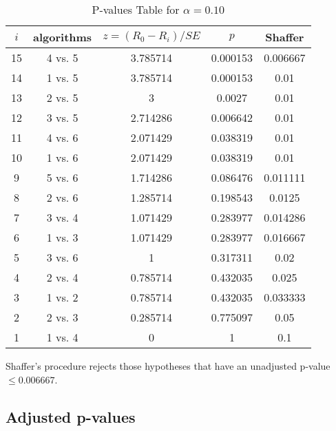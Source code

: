 \documentclass[a4paper,10pt]{article}
\begin{document}
\begin{landscape}
\begin{table}[!htp]
\centering\scriptsize
\begin{tabular}{ccccc}
$i$&algorithms&$z=(R_0 - R_i)/SE$&$p$&Shaffer\\
\hline15&4 vs. 5&3.785714&0.000153&0.006667\\
14&1 vs. 5&3.785714&0.000153&0.01\\
13&2 vs. 5&3&0.0027&0.01\\
12&3 vs. 5&2.714286&0.006642&0.01\\
11&4 vs. 6&2.071429&0.038319&0.01\\
10&1 vs. 6&2.071429&0.038319&0.01\\
9&5 vs. 6&1.714286&0.086476&0.011111\\
8&2 vs. 6&1.285714&0.198543&0.0125\\
7&3 vs. 4&1.071429&0.283977&0.014286\\
6&1 vs. 3&1.071429&0.283977&0.016667\\
5&3 vs. 6&1&0.317311&0.02\\
4&2 vs. 4&0.785714&0.432035&0.025\\
3&1 vs. 2&0.785714&0.432035&0.033333\\
2&2 vs. 3&0.285714&0.775097&0.05\\
1&1 vs. 4&0&1&0.1\\
\hline
\end{tabular}
\caption{P-values Table for $\alpha=0.10$}
\end{table}Shaffer's procedure rejects those hypotheses that have an unadjusted p-value $\le0.006667$.

\pagebreak

\subsection{Adjusted p-values}


\end{landscape}
\end{document}
